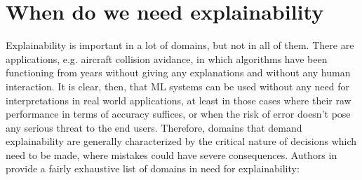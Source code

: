 

\section{When do we need explainability}
Explainability is important in a lot of domains, but not in all of them. There are applications, e.g. aircraft collision avidance, in which algorithms have been functioning from years without giving any explanations and without any human interaction. It is clear, then, that ML systems can be used without any need for interpretations in real world applications, at least in those cases where their raw performance in terms of accuracy suffices, or when the risk of error doesn't pose any serious threat to the end users. Therefore, domains that demand explainability are generally characterized by the critical nature of decisions which need to be made, where mistakes could have severe consequences. Authors in \cite{burkart2021survey} provide a fairly exhaustive list of domains in need for explainability:
